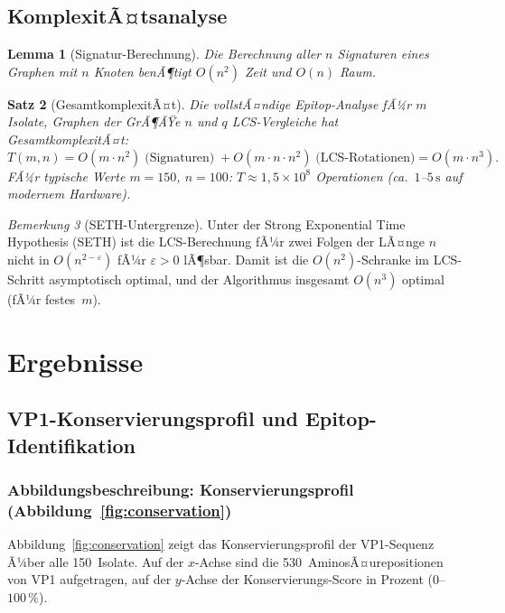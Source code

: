 ﻿\documentclass[a4paper,12pt]{article}
\theoremstyle{plain}
\newtheorem{satz}{Satz}[section]
\newtheorem{lemma}[satz]{Lemma}
\theoremstyle{definition}
\theoremstyle{remark}
\newtheorem{bemerkung}[satz]{Bemerkung}
\begin{document}
\subsection{KomplexitÃ¤tsanalyse}

\begin{lemma}[Signatur-Berechnung]\label{lem:sig}
Die Berechnung aller $n$ Signaturen eines Graphen mit $n$ Knoten benÃ¶tigt
$O(n^2)$ Zeit und $O(n)$ Raum.
\end{lemma}

\begin{satz}[GesamtkomplexitÃ¤t]\label{satz:kompl}
Die vollstÃ¤ndige Epitop-Analyse fÃ¼r $m$ Isolate, Graphen der GrÃ¶ÃŸe $n$
und $q$ LCS-Vergleiche hat GesamtkomplexitÃ¤t:
\[
  T(m,n) = O(m \cdot n^2) \;\text{(Signaturen)}\;
          + O(m \cdot n \cdot n^2) \;\text{(LCS-Rotationen)}
          = O(m \cdot n^3).
\]
FÃ¼r typische Werte $m=150$, $n=100$: $T \approx 1{,}5\times10^8$ Operationen
(ca.\ $1$--$5\,\text{s}$ auf modernem Hardware).
\end{satz}

\begin{bemerkung}[SETH-Untergrenze]
Unter der Strong Exponential Time Hypothesis (SETH) ist die LCS-Berechnung fÃ¼r
zwei Folgen der LÃ¤nge $n$ nicht in $O(n^{2-\varepsilon})$ fÃ¼r $\varepsilon>0$
lÃ¶sbar. Damit ist die $O(n^2)$-Schranke im LCS-Schritt asymptotisch optimal,
und der Algorithmus insgesamt $O(n^3)$ optimal (fÃ¼r festes~$m$).
\end{bemerkung}

\section{Ergebnisse}

\subsection{VP1-Konservierungsprofil und Epitop-Identifikation}

\subsubsection{Abbildungsbeschreibung: Konservierungsprofil (Abbildung~\ref{fig:conservation})}

Abbildung~\ref{fig:conservation} zeigt das Konservierungsprofil der VP1-Sequenz Ã¼ber alle
150~Isolate. Auf der $x$-Achse sind die 530~AminosÃ¤urepositionen von VP1 aufgetragen,
auf der $y$-Achse der Konservierungs-Score in Prozent ($0$--$100\,\%$).
\end{document}
